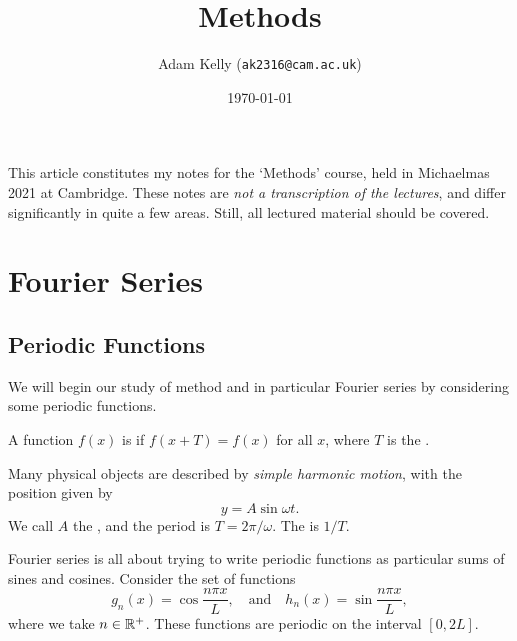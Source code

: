 \documentclass[a4paper]{scrartcl}
\title{Methods}
\author{Adam Kelly (\texttt{ak2316@cam.ac.uk})}
\date{\today}
\begin{document}
\maketitle

% 


This article constitutes my notes for the `Methods' course, held in Michaelmas 2021 at Cambridge. These notes are \emph{not a transcription of the lectures}, and differ significantly in quite a few areas. Still, all lectured material should be covered.



\tableofcontents


\section{Fourier Series}

\subsection{Periodic Functions}

We will begin our study of method and in particular Fourier series by considering some periodic functions.

\begin{definition}[Perioidic]
    A function $f(x)$ is  if $f(x + T) = f(x)$ for all $x$, where $T$ is the . 
\end{definition}

\begin{example}
    Many physical objects are described by \emph{simple harmonic motion}, with the position given by
    $$
    y = A \sin \omega t.
    $$
    We call $A$ the , and the period is $T = 2 \pi / \omega$. The  is $1/T$.
\end{example}

Fourier series is all about trying to write periodic functions as particular sums of sines and cosines. 
Consider the set of functions
$$
g_n(x) = \cos \frac{n \pi x}{L}, \quad \text{and} \quad h_n(x) = \sin \frac{n \pi x}{L},
$$
where we take $n \in \mathbb{R}^+$.  These functions are periodic on the interval $[0, 2L]$.
\end{document}
